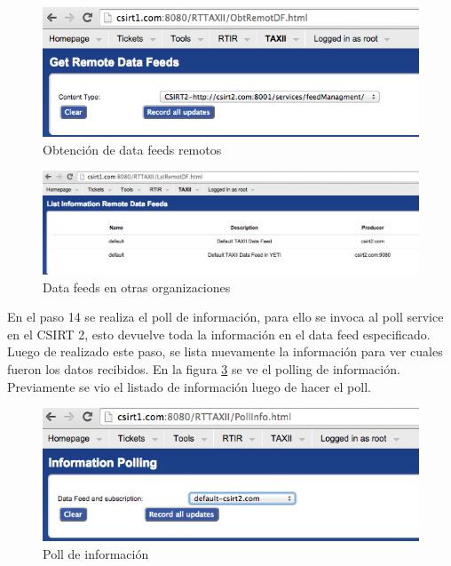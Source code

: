 \begin{figure}[H]
	\centering
	\includegraphics[scale=0.5]{caso-de-estudio/obtremote.png}
	\caption{Obtención de data feeds remotos}
	\label{fig.obtremote}
\end{figure}

\begin{figure}[H]
	\centering
	\includegraphics[scale=0.4]{caso-de-estudio/lstremotedf.png}
	\caption{Data feeds en otras organizaciones}
	\label{fig.lstremotedf}
\end{figure}

En el paso 14 se realiza el poll de información, para ello se invoca al poll service en el CSIRT 2, esto devuelve toda la información en el data feed especificado. Luego de realizado este paso, se lista nuevamente la información para ver cuales fueron los datos recibidos.
En la figura \ref{fig.pollinfo} se ve el polling de información. Previamente se vio el listado de información luego de hacer el poll.

\begin{figure}[H]
	\centering
	\includegraphics[scale=0.4]{caso-de-estudio/pollinformacion.png}
	\caption{Poll de información}
	\label{fig.pollinfo}
\end{figure}

